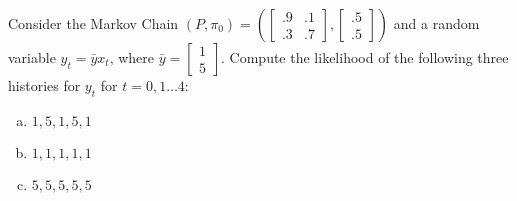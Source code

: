 \documentclass{homework}
\begin{document}
\maketitle

\begin{homeworkProblem}[Problem 2.1]

  Consider the Markov Chain $(P, \pi_0) = \left( \left[\begin{smallmatrix} .9 & .1 \\ .3 & .7 \end{smallmatrix}\right], \left[\begin{smallmatrix} .5 \\ .5 \end{smallmatrix}\right]\right)$ and a random variable $y_t = \bar{y}x_t$, where $\bar{y}  = \left[\begin{smallmatrix} 1 \\ 5 \end{smallmatrix}\right]$. Compute the likelihood of the following three histories for $y_t$ for $t = 0, 1 \dots 4$:

  \begin{enumerate}[a.]
    \item $1, 5, 1, 5, 1$
    \item $1, 1, 1, 1, 1$
    \item $5, 5, 5, 5, 5$
  \end{enumerate}

  \vspace{.2in}

\end{homeworkProblem}
\end{document}
